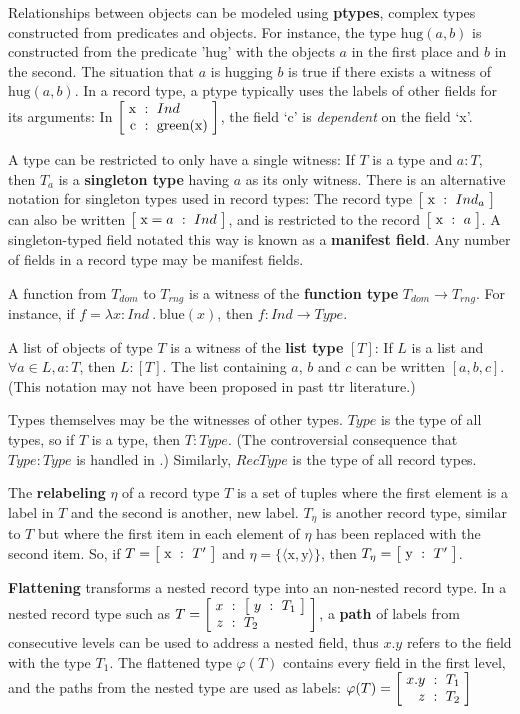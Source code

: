 Relationships between objects can be modeled using \textbf{ptypes}, complex types constructed from predicates and objects.
For instance, the type $\text{hug}(a,b)$ is constructed from the predicate 'hug' with the objects $a$ in the first place and $b$ in the second.
The situation that $a$ is hugging $b$ is true if there exists a witness of $\text{hug}(a,b)$.
In a record type, a ptype typically uses the labels of other fields for its arguments:
In $\rec{\text{x} &:& Ind \\ \text{c} &:& \text{green}(\text{x})}$, the field `c' is \textit{dependent} on the field `x'.

A type can be restricted to only have a single witness:
If $T$ is a type and $a:T$, then $T_a$ is a \textbf{singleton type} having $a$ as its only witness.
There is an alternative notation for singleton types used in record types:
The record type $\rec{\text{x} &:& Ind_a}$ can also be written $\rec{\text{x}=a &:& Ind}$, and is restricted to the record $\rec{\text{x} &:& a}$.
A singleton-typed field notated this way is known as a \textbf{manifest field}.
Any number of fields in a record type may be manifest fields.

A function from $T_{dom}$ to $T_{rng}$ is a witness of the \textbf{function type} $T_{dom} \rightarrow T_{rng}$.
For instance, if $f = \lambda x : Ind\ .\ \text{blue}(x)$, then $f : Ind \rightarrow Type$.

A list of objects of type $T$ is a witness of the \textbf{list type} $[T]$:
If $L$ is a list and $\forall a \in L, a : T$, then $L : [T]$.
The list containing $a$, $b$ and $c$ can be written $[a, b, c]$.
(This notation may not have been proposed in past \gls{ttr} literature.)

Types themselves may be the witnesses of other types.
$Type$ is the type of all types, so if $T$ is a type, then $T : Type$.
(The controversial consequence that $Type : Type$ is handled in \citet[section 2.7]{CooperTypetheorysemantics2012}.)
Similarly, $RecType$ is the type of all record types.

The \textbf{relabeling} $\eta$ of a record type $T$ is a set of tuples where the first element is a label in $T$ and the second is another, new label.
$T_\eta$ is another record type, similar to $T$ but where the first item in each element of $\eta$ has been replaced with the second item.
So, if $T = \rec{\text{x} &:& T'}$ and $\eta = \{\langle \text{x}, \text{y}\rangle\}$, then $T_\eta = \rec{\text{y} &:& T'}$.

\textbf{Flattening} transforms a nested record type into an non-nested record type.
In a nested record type such as $T = \rec{x &:& \rec{y &:& T_1} \\ z &:& T_2}$, a \textbf{path} of labels from consecutive levels can be used to address a nested field, thus $x.y$ refers to the field with the type $T_1$.
The flattened type $\varphi(T)$ contains every field in the first level, and the paths from the nested type are used as labels:
$\varphi(T) = \rec{x.y &:& T_1 \\ z &:& T_2}$

